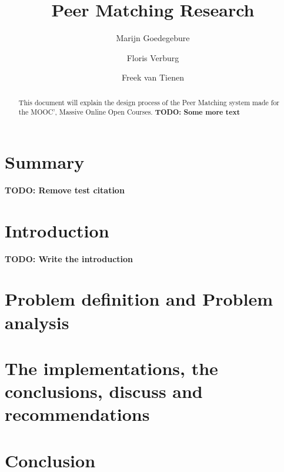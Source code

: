 \documentclass[]{article}
\title{Peer Matching Research}
\author{Marijn Goedegebure \and
	Floris Verburg \and
	Freek van Tienen}
\date{}
\newcommand{\TODO}[1]{{\color{red}\textbf{TODO: #1}}}
\begin{document}
\maketitle

\begin{abstract}
This document will explain the design process of the Peer Matching system made for the MOOC', Massive Online Open Courses.
\TODO{Some more text}
\end{abstract}

\tableofcontents

\section{Summary}
\TODO{Remove test citation\cite{policella07}}

\section{Introduction}
\TODO{Write the introduction}

\section{Problem definition and Problem analysis}

\section{The implementations,	the conclusions, discuss and recommendations}

\section{Conclusion}

\newpage


\end{document}
